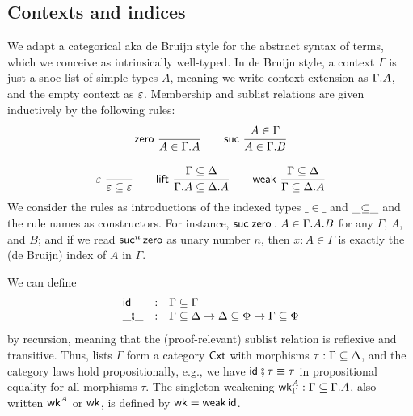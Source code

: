 \documentclass[sigplan,screen,fleqn,review]{acmart} %
\begin{document}
\subsection{Contexts and indices}

We adapt a categorical aka de Bruijn style for the abstract syntax of
terms, which we conceive as intrinsically well-typed.  In de Bruijn
style, a context $\Gamma$ is just a snoc list of simple types $A$,
meaning we write context extension as $\Gamma.A$, and the empty
context as $\varepsilon$.  Membership  and sublist
relations \fbox{$\Gamma \sublist \Delta$} are given inductively by the
following rules:
\begin{gather*}
  \nru{\tzero}{}{A \in \cext \Gamma A}
\qquad
  \nru{\tsuc}{A \in \Gamma}{A \in \cext \Gamma B}
\\[2ex]
  \nru{\tdone}{}{\cempty \sublist \cempty}
\qquad
  \nru{\tlift}
    {\Gamma \sublist \Delta}
    {\cext \Gamma A \sublist \cext \Delta A}
\qquad
  \nru{\tweak}
    {\Gamma \sublist \Delta}
    {\Gamma \sublist \cext \Delta A}
\end{gather*}
We consider the rules as introductions of the indexed types
$\_{\in}\_$ and $\_{\subseteq}\_$ and the rule names as constructors.
For instance, $\mathsf{\mathsf{suc}\;\mathsf{zero}} : A \in \Gamma.A.B$ for any
$\Gamma$, $A$, and $B$; and if we read $\mathsf{suc}^n\,\mathsf{zero}$ as unary
number $n$, then $x : A \in \Gamma$ is exactly the (de Bruijn) index
of $A$ in $\Gamma$.

We can define
\[
\begin{array}{lcl}
\mathsf{id} & : & \Gamma \subseteq \Gamma
\\
\_{\fatsemi}\_ & : & \Gamma
\subseteq \Delta \to \Delta \subseteq \Phi \to \Gamma \subseteq \Phi
\end{array}
\]
by recursion, meaning that the (proof-relevant)
sublist relation is reflexive and transitive.
Thus, lists $\Gamma$ form a category
$\mathsf{Cxt}$ with morphisms $\tau : \Gamma \subseteq \Delta$, and the category laws
hold propositionally, e.g., we have $\mathsf{id}_{} \fatsemi \tau \equiv \tau$ in
propositional equality for all morphisms $\tau$.
The singleton weakening $\mathsf{wk}^A_\Gamma : \Gamma \subseteq \Gamma.A$,
also written $\mathsf{wk}^A$ or $\mathsf{wk}$, is defined by $\mathsf{wk} = \mathsf{weak}\,\mathsf{id}$.
\end{document}
